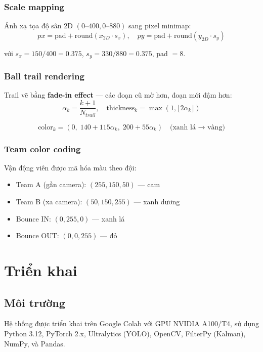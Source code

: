 \documentclass[12pt,a4paper]{article}
\begin{document}
\subsubsection{Scale mapping}
Ánh xạ tọa độ sân 2D $(0\text{--}400, 0\text{--}880)$ sang pixel minimap:
\begin{equation}
px = \text{pad} + \text{round}(x_{2D} \cdot s_x), \quad py = \text{pad} + \text{round}(y_{2D} \cdot s_y)
\end{equation}

với $s_x = 150/400 = 0.375$, $s_y = 330/880 = 0.375$, pad $= 8$.

\subsubsection{Ball trail rendering}
Trail vẽ bằng \textbf{fade-in effect} --- các đoạn cũ mờ hơn, đoạn mới đậm hơn:
\begin{equation}
\alpha_k = \frac{k+1}{N_{trail}}, \quad \text{thickness}_k = \max(1, \lfloor 2\alpha_k \rfloor)
\end{equation}

\begin{equation}
\text{color}_k = \left(0, \; 140 + 115\alpha_k, \; 200 + 55\alpha_k\right) \quad \text{(xanh lá → vàng)}
\end{equation}

\subsubsection{Team color coding}
Vận động viên được mã hóa màu theo đội:
\begin{itemize}[noitemsep]
    \item Team A (gần camera): $(255, 150, 50)$ --- cam
    \item Team B (xa camera): $(50, 150, 255)$ --- xanh dương
    \item Bounce IN: $(0, 255, 0)$ --- xanh lá
    \item Bounce OUT: $(0, 0, 255)$ --- đỏ
\end{itemize}

\section{Triển khai}
\label{sec:implementation}

\subsection{Môi trường}
Hệ thống được triển khai trên Google Colab với GPU NVIDIA A100/T4, sử dụng Python 3.12, PyTorch 2.x, Ultralytics (YOLO), OpenCV, FilterPy (Kalman), NumPy, và Pandas.
\end{document}
